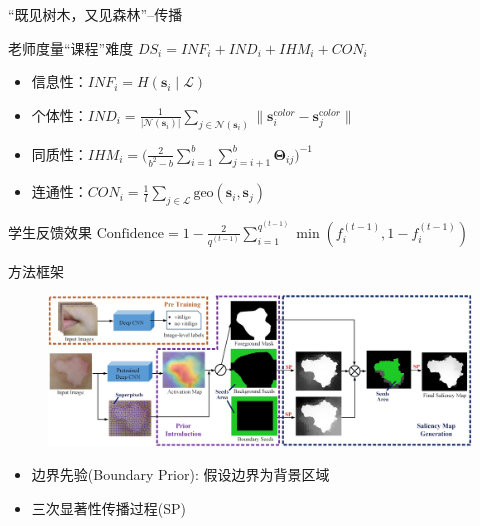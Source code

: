 \begin{frame}{``既见树木，又见森林''--传播}

\begin{block}{老师度量``课程''难度}
$DS_i=INF_i+IND_i+IHM_i+CON_i$
\begin{itemize}
\item 信息性：$INF_i=H(\mathbf{s}_i \mid \mathcal{L})$
\item 个体性：$IND_i=\frac{1}{|\mathcal{N}(\mathbf{s}_i)|}\sum_{j\in \mathcal{N}(\mathbf{s}_i)}\| \mathbf{s}_i^{\mathrm color}-\mathbf{s}_j^{\mathrm color}\|$
\item 同质性：$IHM_i=\Big (\frac{2}{b^2-b}\sum_{i=1}^b \sum_{j=i+1}^b\pmb{\Theta}_{ij}\Big )^{-1}$
\item 连通性：$CON_i=\frac{1}{l}\sum_{j\in \mathcal{L}}\mathrm{geo}({\mathbf{s}_i,\mathbf{s}_j})$
\end{itemize}
\end{block}

\begin{block}{学生反馈效果}
$\mathrm{Confidence}=1-\frac{2}{q^{(t-1)}}\sum_{i=1}^{q^{(t-1)}}\min{(f_i^{(t-1)},1-f_i^{(t-1)})}$
\end{block}
\end{frame}
\begin{frame}{方法框架}
\begin{figure}
    \centering
    \includegraphics[width=\linewidth]{figures/CNNandSuperPixelModelGraph3.jpg}
\end{figure}
\begin{itemize}
\item 边界先验(Boundary Prior): 假设边界为背景区域
\item 三次显著性传播过程({\color{red}SP})
\end{itemize}
\end{frame}




























